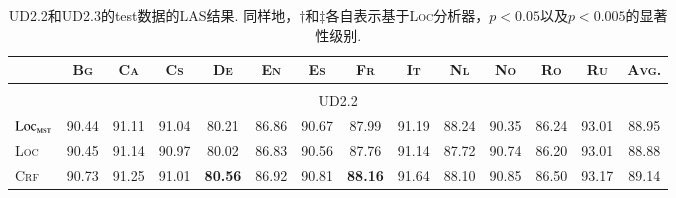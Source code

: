 \begin{table*}[tb]
  \setlength{\tabcolsep}{3.3pt}
  \centering
  \caption{UD2.2和UD2.3的test数据的LAS结果.
    同样地，$\dagger$和$\ddagger$各自表示基于\textsc{Loc}分析器，$p<0.05$以及$p<0.005$的显著性级别. }
  \begin{tabularx}{\textwidth}{lccccccccccccc}
    \toprule
                                      & \textsc{Bg}    & \textsc{Ca}    & \textsc{Cs}                      & \textsc{De}                     & \textsc{En}                     & \textsc{Es}                      & \textsc{Fr}                     & \textsc{It}                      & \textsc{Nl}                      & \textsc{No}                     & \textsc{Ro}                      & \textsc{Ru}                      & \textsc{Avg.}                    \\[1pt]
    \hline
    \\[-15pt]
    \multicolumn{14}{c}{UD2.2}                                                                                                                                                                                                                                                                                                                                                                                                                                       \\[1pt]
    $\textsc{Loc}_{\textsc{mst}}$     & 90.44          & 91.11          & 91.04                            & 80.21                           & 86.86                           & 90.67                            & 87.99                           & 91.19                            & 88.24                            & 90.35                           & 86.24                            & 93.01                            & 88.95                            \\
    \textsc{Loc}                      & 90.45          & 91.14          & 90.97                            & 80.02                           & 86.83                           & 90.56                            & 87.76                           & 91.14                            & 87.72                            & 90.74                           & 86.20                            & 93.01                            & 88.88                            \\
    \textsc{Crf}                      & 90.73          & 91.25          & 91.01                            & \textbf{80.56}\rlap{$^\dagger$} & 86.92                           & 90.81\rlap{$^\dagger$}           & \textbf{88.16}                  & 91.64\rlap{$^\dagger$}           & 88.10                            & 90.85                           & 86.50                            & 93.17\rlap{$^\dagger$}           & 89.14\rlap{$^\ddagger$}          \\

\end{tabularx}
\end{table*}
